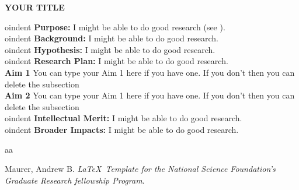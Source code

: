 \documentclass[12pt]{article}
\begin{document}
\begin{center}
\large{\bf YOUR TITLE} \\
\end{center}

oindent
\textbf{Purpose:} I might be able to do good research (see \cite{amau}).\\


oindent
\textbf{Background:} I might be able to do good research.\\


oindent
\textbf{Hypothesis:} I might be able to do good research.\\


oindent
\textbf{Research Plan:} I might be able to do good research.\\
\textbf{Aim 1} You can type your Aim 1 here if you have one. If you don't then you can delete the subsection\\ 
\textbf{Aim 2} You can type your Aim 1 here if you have one. If you don't then you can delete the subsection\\ 


oindent
\textbf{Intellectual Merit:} I might be able to do good research.\\



oindent
\textbf{Broader Impacts:} I might be able to do good research.\\


\footnotesize
\begin{thebibliography}{aa}

 Maurer, Andrew B. \emph{\LaTeX \ Template for the National Science Foundation's Graduate Research fellowship Program}.

\end{thebibliography}
\end{document}
